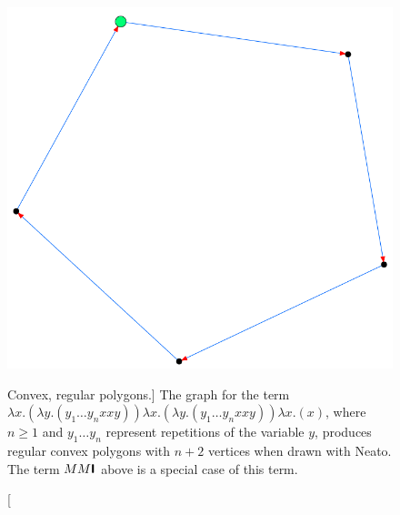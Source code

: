\begin{figure}[htbp]
{		\includegraphics[height=\exampleheight]{../images/Polygon5_NEATO.png}
	}
	\caption
	[Convex, regular polygons.]
	{The graph for the term $\lambda x.(\lambda y.(y_1 \hdots y_n x x y)) \lambda x.(\lambda y.(y_1 \hdots y_n x x y)) \lambda x.(x)$,
	where $n\geq 1$ and $y_1\hdots y_n$ represent repetitions of the variable $y$, 
	produces regular convex polygons with $n+2$ vertices when drawn with Neato. 
	The term $MM\textsf{\textbf{I}}$ above is a special case of this term. }
	\label{fig:images_Polygon_NEATO}
\end{figure}

